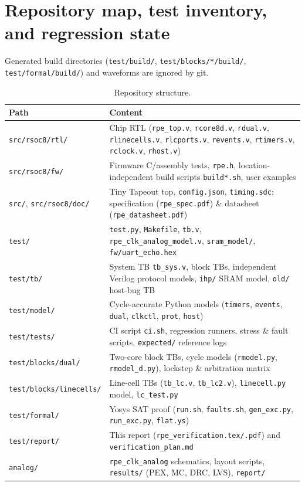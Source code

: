 \documentclass[10pt,a4paper]{article}
\begin{document}
\section{Repository map, test inventory, and regression state}\label{sec:where}

Generated build directories (\texttt{test/build/}, \texttt{test/blocks/*/build/}, \texttt{test/formal/build/}) and
waveforms are ignored by git.

\begin{table}[H]
\centering\small
\begin{tabularx}{\linewidth}{@{}lL@{}}
\toprule
Path & Content \\
\midrule
\texttt{src/rsoc8/rtl/} & Chip RTL (\texttt{rpe\_top.v}, \texttt{rcore8d.v}, \texttt{rdual.v}, \texttt{rlinecells.v}, \texttt{rlcports.v}, \texttt{revents.v}, \texttt{rtimers.v}, \texttt{rclock.v}, \texttt{rhost.v}) \\
\texttt{src/rsoc8/fw/} & Firmware C/assembly tests, \texttt{rpe.h}, location-independent build scripts \texttt{build*.sh}, user examples \\
\texttt{src/}, \texttt{src/rsoc8/doc/} & Tiny Tapeout top, \texttt{config.json}, \texttt{timing.sdc}; specification (\texttt{rpe\_spec.pdf}) \& datasheet (\texttt{rpe\_datasheet.pdf}) \\
\texttt{test/} & \texttt{test.py}, \texttt{Makefile}, \texttt{tb.v}, \texttt{rpe\_clk\_analog\_model.v}, \texttt{sram\_model/}, \texttt{fw/uart\_echo.hex} \\
\texttt{test/tb/} & System TB \texttt{tb\_sys.v}, block TBs, independent Verilog protocol models, \texttt{ihp/} SRAM model, \texttt{old/} host-bug TB \\
\texttt{test/model/} & Cycle-accurate Python models (\texttt{timers}, \texttt{events}, \texttt{dual}, \texttt{clkctl}, \texttt{prot}, \texttt{host}) \\
\texttt{test/tests/} & CI script \texttt{ci.sh}, regression runners, stress \& fault scripts, \texttt{expected/} reference logs \\
\texttt{test/blocks/dual/} & Two-core block TBs, cycle models (\texttt{rmodel.py}, \texttt{rmodel\_d.py}), lockstep \& arbitration matrix \\
\texttt{test/blocks/linecells/} & Line-cell TBs (\texttt{tb\_lc.v}, \texttt{tb\_lc2.v}), \texttt{linecell.py} model, \texttt{lc\_test.py} \\
\texttt{test/formal/} & Yosys SAT proof (\texttt{run.sh}, \texttt{faults.sh}, \texttt{gen\_exc.py}, \texttt{run\_exc.py}, \texttt{flat.ys}) \\
\texttt{test/report/} & This report (\texttt{rpe\_verification.tex/.pdf}) and \texttt{verification\_plan.md} \\
\texttt{analog/} & \texttt{rpe\_clk\_analog} schematics, layout scripts, \texttt{results/} (PEX, MC, DRC, LVS), \texttt{report/} \\
\bottomrule
\end{tabularx}
\caption{Repository structure.}
\end{table}
\end{document}
